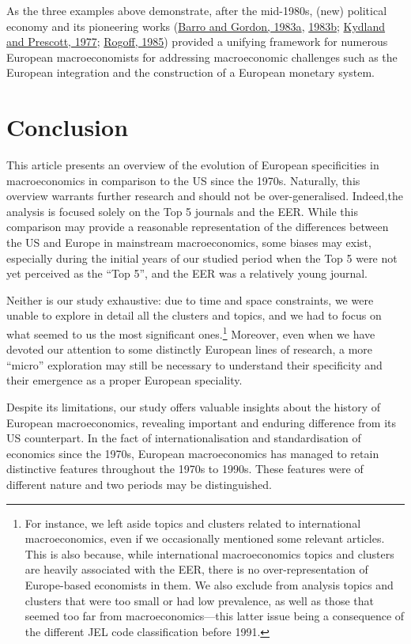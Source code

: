 \documentclass[
  12pt,
  onecolumn]{article}
\begin{document}
As the three examples above demonstrate, after the mid-1980s, (new) political economy and its pioneering works (\protect\hyperlink{ref-barro1983}{Barro and Gordon, 1983a}, \protect\hyperlink{ref-barro1983c}{1983b}; \protect\hyperlink{ref-kydland1977}{Kydland and Prescott, 1977}; \protect\hyperlink{ref-rogoff1985b}{Rogoff, 1985}) provided a unifying framework for numerous European macroeconomists for addressing macroeconomic challenges such as the European integration and the construction of a European monetary system.

\hypertarget{conclusion}{%
\section*{Conclusion}\label{conclusion}}

This article presents an overview of the evolution of European specificities in macroeconomics in comparison to the US since the 1970s. Naturally, this overview warrants further research and should not be over-generalised. Indeed,the analysis is focused solely on the Top 5 journals and the EER. While this comparison may provide a reasonable representation of the differences between the US and Europe in mainstream macroeconomics, some biases may exist, especially during the initial years of our studied period when the Top 5 were not yet perceived as the ``Top 5'', and the EER was a relatively young journal.

Neither is our study exhaustive: due to time and space constraints, we were unable to explore in detail all the clusters and topics, and we had to focus on what seemed to us the most significant ones.\footnote{For instance, we left aside topics and clusters related to international macroeconomics, even if we occasionally mentioned some relevant articles. This is also because, while international macroeconomics topics and clusters are heavily associated with the EER, there is no over-representation of Europe-based economists in them. We also exclude from analysis topics and clusters that were too small or had low prevalence, as well as those that seemed too far from macroeconomics---this latter issue being a consequence of the different JEL code classification before 1991.} Moreover, even when we have devoted our attention to some distinctly European lines of research, a more ``micro'' exploration may still be necessary to understand their specificity and their emergence as a proper European speciality.

Despite its limitations, our study offers valuable insights about the history of European macroeconomics, revealing important and enduring difference from its US counterpart. In the fact of internationalisation and standardisation of economics since the 1970s, European macroeconomics has managed to retain distinctive features throughout the 1970s to 1990s. These features were of different nature and two periods may be distinguished.
\end{document}
